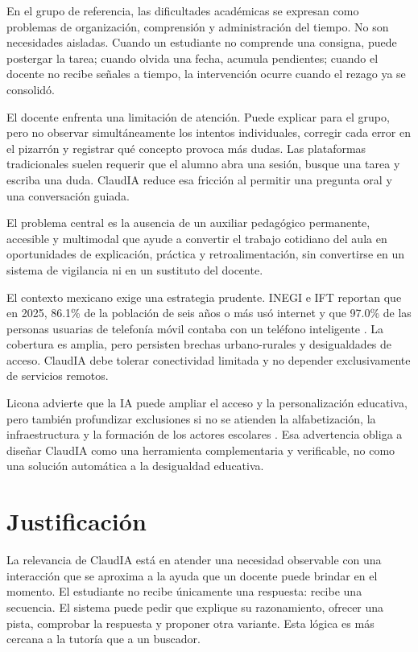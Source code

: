 \documentclass[letterpaper,11pt]{article}
\begin{document}
En el grupo de referencia, las dificultades académicas se expresan como problemas de organización, comprensión y administración del tiempo. No son necesidades aisladas. Cuando un estudiante no comprende una consigna, puede postergar la tarea; cuando olvida una fecha, acumula pendientes; cuando el docente no recibe señales a tiempo, la intervención ocurre cuando el rezago ya se consolidó.

El docente enfrenta una limitación de atención. Puede explicar para el grupo, pero no observar simultáneamente los intentos individuales, corregir cada error en el pizarrón y registrar qué concepto provoca más dudas. Las plataformas tradicionales suelen requerir que el alumno abra una sesión, busque una tarea y escriba una duda. ClaudIA reduce esa fricción al permitir una pregunta oral y una conversación guiada.

El problema central es la ausencia de un auxiliar pedagógico permanente, accesible y multimodal que ayude a convertir el trabajo cotidiano del aula en oportunidades de explicación, práctica y retroalimentación, sin convertirse en un sistema de vigilancia ni en un sustituto del docente.

El contexto mexicano exige una estrategia prudente. INEGI e IFT reportan que en 2025, 86.1\% de la población de seis años o más usó internet y que 97.0\% de las personas usuarias de telefonía móvil contaba con un teléfono inteligente \cite{inegi2026}. La cobertura es amplia, pero persisten brechas urbano-rurales y desigualdades de acceso. ClaudIA debe tolerar conectividad limitada y no depender exclusivamente de servicios remotos.

Licona advierte que la IA puede ampliar el acceso y la personalización educativa, pero también profundizar exclusiones si no se atienden la alfabetización, la infraestructura y la formación de los actores escolares \cite{licona2024}. Esa advertencia obliga a diseñar ClaudIA como una herramienta complementaria y verificable, no como una solución automática a la desigualdad educativa.

\clearpage

\section{Justificación}

La relevancia de ClaudIA está en atender una necesidad observable con una interacción que se aproxima a la ayuda que un docente puede brindar en el momento. El estudiante no recibe únicamente una respuesta: recibe una secuencia. El sistema puede pedir que explique su razonamiento, ofrecer una pista, comprobar la respuesta y proponer otra variante. Esta lógica es más cercana a la tutoría que a un buscador.
\end{document}
